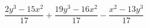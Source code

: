 \begin{ex}
	\begin{condition}
		\( \dfrac{2y^3-15x^2}{17}+\dfrac{19y^3-16x^2}{17}-\dfrac{x^2-13y^3}{17} \)
	\end{condition}
\end{ex}